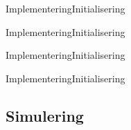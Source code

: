 \begin{frame}{Implementering}{Initialisering}
 \vfill\vfill\centering  
    \begin{figure}[H]
 \centering
 
\label{fig:curvefit_comparision}
\end{figure}
 \vfill\vfill
\end{frame}

\begin{frame}{Implementering}{Initialisering}
\begin{figure}[H]
 \centering
 
\label{fig:curvefit_comparision_split}
\end{figure}


\end{frame}



\begin{frame}{Implementering}{Initialisering}
 \vfill\vfill\centering  
 \begin{figure}[H]
 \centering
 
\label{fig:fredericia_init_steady_state}
\end{figure}   

 \vfill\vfill
\end{frame}

\begin{frame}{Implementering}{Initialisering}
 \vfill\vfill\centering  
 \begin{figure}[H]
 \centering
 
\label{fig:fredericia_init_steady_state_lut}
\end{figure}  
 \vfill\vfill
\end{frame}

\subsection{Simulering}

